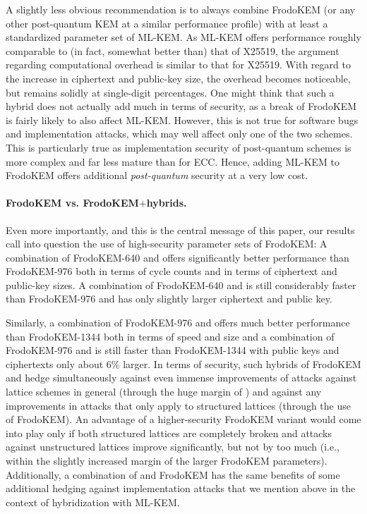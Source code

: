 A slightly less obvious recommendation is to always combine FrodoKEM 
(or any other post-quantum KEM at a similar performance profile)
with at least a standardized parameter set of ML-KEM. As ML-KEM offers
performance roughly comparable to (in fact, somewhat better than) that of X25519,
the argument regarding computational overhead is similar to that for
X25519. With regard to the increase in ciphertext and public-key size, the overhead
becomes noticeable, but remains solidly at single-digit percentages.
One might think that such a hybrid does not actually add much in terms
of security, as a break of FrodoKEM is fairly likely to also affect
ML-KEM. However, this is not true for software bugs and implementation attacks, 
which may well affect only one of the two schemes. This is particularly
true as implementation security of post-quantum schemes is more complex
and far less mature than for ECC.  Hence, adding ML-KEM
to FrodoKEM offers additional \emph{post-quantum} security at a very low cost.

\paragraph{FrodoKEM vs. FrodoKEM$+$\kaiburr hybrids.}
Even more importantly, and this is the central message of this paper,
our results call into question the use of high-security parameter sets of FrodoKEM: 
A combination of FrodoKEM-640 and  offers significantly better performance than FrodoKEM-976
both in terms of cycle counts and in terms of ciphertext and public-key sizes.
A combination of FrodoKEM-640 and  is still considerably faster
than FrodoKEM-976 and has only slightly larger ciphertext and public key.

Similarly, a combination of FrodoKEM-976 and  offers much better
performance than FrodoKEM-1344 both in terms of speed and size and a combination
of FrodoKEM-976 and  is still faster than FrodoKEM-1344 with public keys
and ciphertexts only about $6$\% larger. In terms of security, such hybrids 
of FrodoKEM and \kaiburr hedge simultaneously against even immense improvements 
of attacks against lattice schemes in general (through the huge margin of \kaiburr) and 
against any improvements in attacks that only apply to structured lattices 
(through the use of FrodoKEM). An advantage of a higher-security FrodoKEM
variant would come into play only if both structured lattices are completely
broken and attacks against unstructured lattices improve significantly, but
not by too much (i.e., within the slightly increased margin of the larger
FrodoKEM parameters). Additionally, a combination of \kaiburr and FrodoKEM
has the same benefits of some additional hedging against implementation
attacks that we mention above in the context of hybridization with ML-KEM.

